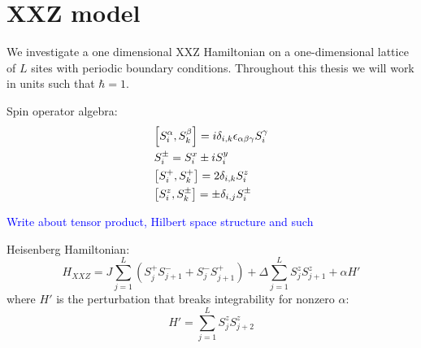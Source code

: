 \chapter{XXZ model}
\thispagestyle{chapterBeginStyle}

We investigate a one dimensional XXZ Hamiltonian on a one-dimensional lattice of \(L\) sites with periodic boundary conditions.
Throughout this thesis we will work in units such that \(\hbar = 1\).

Spin operator algebra:
\begin{align*}
    &\comm{S_{i}^{\alpha}}{S_{k}^{\beta}} = i  \delta_{i,k}\epsilon_{\alpha \beta \gamma} S_{i}^{\gamma}\\
    &S_{i}^{\pm} = \Sx_i \pm i \Sy_i\\
    &\comm{\Sp_i}{\Sp_k} = 2 \delta_{i,k} \Sz_i \\
    &\comm{\Sz_i}{S^{\pm}_k} = \pm \delta_{i,j} S_{i}^{\pm}
\end{align*}

\textcolor{blue}{Write about tensor product, Hilbert space structure and such}

\noindent Heisenberg Hamiltonian:
\begin{equation}
    H_{XXZ} = J\sum_{j = 1}^{L}\left( S^{+}_{j} S^{-}_{j+1} + S^{-}_{j}S^{+}_{j+1} \right) + \Delta\sum_{j = 1}^{L} S^{z}_{j}S^{z}_{j+1}
    + \alpha H'
    \label{eq:HXXZ}
\end{equation}
where \(H'\) is the perturbation that breaks integrability for nonzero \(\alpha\):
\begin{equation}
    H'=\sum_{j = 1}^{L} S^{z}_{j}S^{z}_{j+2}
\end{equation}
